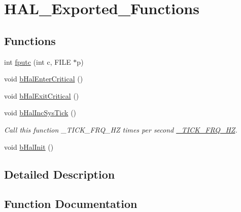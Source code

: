 \hypertarget{group___h_a_l___exported___functions}{}\section{H\+A\+L\+\_\+\+Exported\+\_\+\+Functions}
\label{group___h_a_l___exported___functions}
\subsection*{Functions}
\begin{DoxyCompactItemize}
\item 
int \mbox{\hyperlink{group___h_a_l___exported___functions_gaf709c07e26adbffa5d9984b2cec63c69}{fputc}} (int c, F\+I\+LE $\ast$p)
\item 
void \mbox{\hyperlink{group___h_a_l___exported___functions_gac4b3d313f1c9c001234743725e491b9a}{b\+Hal\+Enter\+Critical}} ()
\item 
void \mbox{\hyperlink{group___h_a_l___exported___functions_ga9b005cf96b043e836780e1cc1b9254fc}{b\+Hal\+Exit\+Critical}} ()
\item 
void \mbox{\hyperlink{group___h_a_l___exported___functions_ga1e845f28a0763b4046d1c7cdcf227e52}{b\+Hal\+Inc\+Sys\+Tick}} ()
\begin{DoxyCompactList}\small\item\em Call this function \+\_\+\+T\+I\+C\+K\+\_\+\+F\+R\+Q\+\_\+\+HZ times per second \mbox{\hyperlink{b__config_8h_ae2076738df8e2eff78366a0187291367}{\+\_\+\+T\+I\+C\+K\+\_\+\+F\+R\+Q\+\_\+\+HZ}}. \end{DoxyCompactList}\item 
void \mbox{\hyperlink{group___h_a_l___exported___functions_ga67c9cec578e4150ae30c526e88e60f97}{b\+Hal\+Init}} ()
\end{DoxyCompactItemize}


\subsection{Detailed Description}


\subsection{Function Documentation}
\mbox{\label{group___h_a_l___exported___functions_gac4b3d313f1c9c001234743725e491b9a}} 

